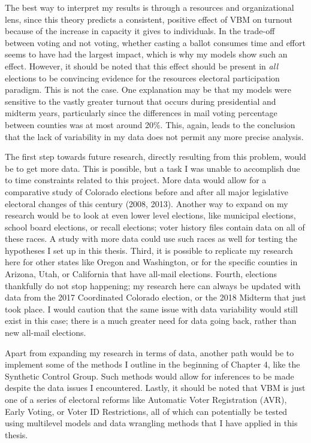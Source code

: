 \documentclass[12pt,twoside]{reedthesis}
\begin{document}
  The best way to interpret my results is through a resources and
  organizational lens, since this theory predicts a consistent, positive
  effect of VBM on turnout because of the increase in capacity it gives to
  individuals. In the trade-off between voting and not voting, whether
  casting a ballot consumes time and effort seems to have had the largest
  impact, which is why my models show such an effect. However, it should
  be noted that this effect should be present in \emph{all} elections to
  be convincing evidence for the resources electoral participation
  paradigm. This is not the case. One explanation may be that my models
  were sensitive to the vastly greater turnout that occurs during
  presidential and midterm years, particularly since the differences in
  mail voting percentage between counties was at most around 20\%. This,
  again, leads to the conclusion that the lack of variability in my data
  does not permit any more precise analysis.
  
  The first step towards future research, directly resulting from this
  problem, would be to get more data. This is possible, but a task I was
  unable to accomplish due to time constraints related to this project.
  More data would allow for a comparative study of Colorado elections
  before and after all major legislative electoral changes of this century
  (2008, 2013). Another way to expand on my research would be to look at
  even lower level elections, like municipal elections, school board
  elections, or recall elections; voter history files contain data on all
  of these races. A study with more data could use such races as well for
  testing the hypotheses I set up in this thesis. Third, it is possible to
  replicate my research here for other states like Oregon and Washington,
  or for the specific counties in Arizona, Utah, or California that have
  all-mail elections. Fourth, elections thankfully do not stop happening;
  my research here can always be updated with data from the 2017
  Coordinated Colorado election, or the 2018 Midterm that just took place.
  I would caution that the same issue with data variability would still
  exist in this case; there is a much greater need for data going back,
  rather than new all-mail elections.
  
  Apart from expanding my research in terms of data, another path would be
  to implement some of the methods I outline in the beginning of Chapter
  4, like the Synthetic Control Group. Such methods would allow for
  inferences to be made despite the data issues I encountered. Lastly, it
  should be noted that VBM is just one of a series of electoral reforms
  like Automatic Voter Registration (AVR), Early Voting, or Voter ID
  Restrictions, all of which can potentially be tested using multilevel
  models and data wrangling methods that I have applied in this thesis.
  
\end{document}
